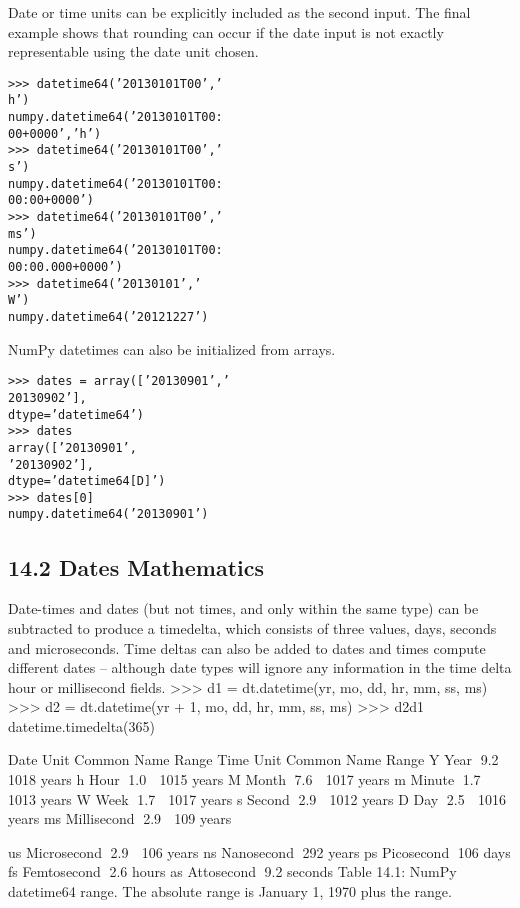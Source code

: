 \documentclass[11pt]{article} %
\begin{document}
Date or time units can be explicitly included as the second input. The final example shows that rounding
can occur if the date input is not exactly representable using the date unit chosen.
\begin{framed}
\begin{verbatim}
>>> datetime64(’20130101T00’,’
h’)
numpy.datetime64(’20130101T00:
00+0000’,’h’)
>>> datetime64(’20130101T00’,’
s’)
numpy.datetime64(’20130101T00:
00:00+0000’)
>>> datetime64(’20130101T00’,’
ms’)
numpy.datetime64(’20130101T00:
00:00.000+0000’)
>>> datetime64(’20130101’,’
W’)
numpy.datetime64(’20121227’)
\end{verbatim}
\end{framed}

NumPy datetimes can also be initialized from arrays.
\begin{framed}
\begin{verbatim}
>>> dates = array([’20130901’,’
20130902’],
dtype=’datetime64’)
>>> dates
array([’20130901’,
’20130902’],
dtype=’datetime64[D]’)
>>> dates[0]
numpy.datetime64(’20130901’)
\end{verbatim}
\end{framed}
\newpage
\subsection{14.2 Dates Mathematics}
Date-times and dates (but not times, and only within the same type) can be subtracted to produce a
timedelta, which consists of three values, days, seconds and microseconds. Time deltas can also be added
to dates and times compute different dates – although date types will ignore any information in the time
delta hour or millisecond fields.
>>> d1 = dt.datetime(yr, mo, dd, hr, mm, ss, ms)
>>> d2 = dt.datetime(yr + 1, mo, dd, hr, mm, ss, ms)
>>> d2d1
datetime.timedelta(365)


Date Unit Common Name Range Time Unit Common Name Range
Y Year 9.2  1018 years h Hour 1.0  1015 years
M Month 7.6  1017 years m Minute 1.7  1013 years
W Week 1.7  1017 years s Second 2.9  1012 years
D Day 2.5  1016 years ms Millisecond 2.9  109 years

us Microsecond 2.9  106 years
ns Nanosecond 292 years
ps Picosecond 106 days
fs Femtosecond 2.6 hours
as Attosecond 9.2 seconds
Table 14.1: NumPy datetime64 range. The absolute range is January 1, 1970 plus the range.
\end{document}
